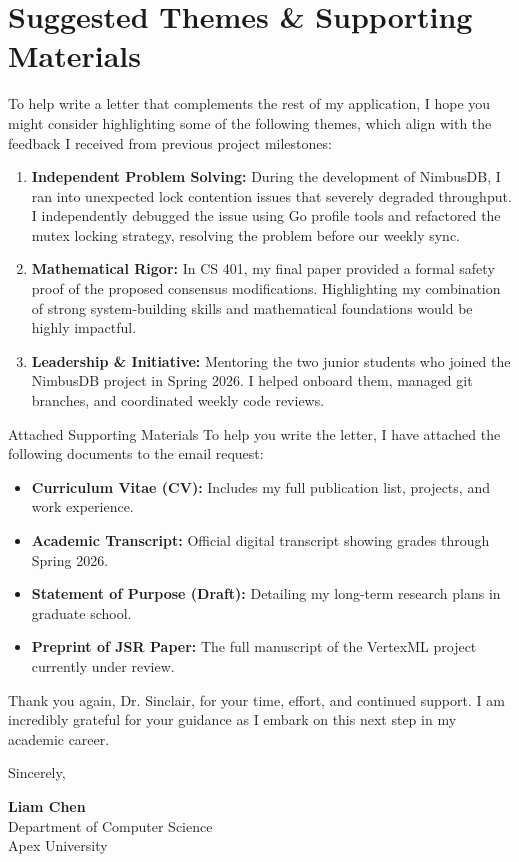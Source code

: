 \section{Suggested Themes \& Supporting Materials}

\noindent
To help write a letter that complements the rest of my application, I hope you might consider highlighting some of the following themes, which align with the feedback I received from previous project milestones:

\begin{enumerate}
    \item \textbf{Independent Problem Solving:} During the development of NimbusDB, I ran into unexpected lock contention issues that severely degraded throughput. I independently debugged the issue using Go profile tools and refactored the mutex locking strategy, resolving the problem before our weekly sync.
    \item \textbf{Mathematical Rigor:} In CS 401, my final paper provided a formal safety proof of the proposed consensus modifications. Highlighting my combination of strong system-building skills and mathematical foundations would be highly impactful.
    \item \textbf{Leadership \& Initiative:} Mentoring the two junior students who joined the NimbusDB project in Spring 2026. I helped onboard them, managed git branches, and coordinated weekly code reviews.
\end{enumerate}

\vspace{1.5em}

\begin{accentbox}{Attached Supporting Materials}
To help you write the letter, I have attached the following documents to the email request:
\begin{itemize}
    \item[\faFile] \textbf{Curriculum Vitae (CV):} Includes my full publication list, projects, and work experience.
    \item[\faGraduationCap] \textbf{Academic Transcript:} Official digital transcript showing grades through Spring 2026.
    \item[\faPen] \textbf{Statement of Purpose (Draft):} Detailing my long-term research plans in graduate school.
    \item[\faBook] \textbf{Preprint of JSR Paper:} The full manuscript of the VertexML project currently under review.
\end{itemize}
\end{accentbox}

\vspace{2em}

\noindent
Thank you again, Dr. Sinclair, for your time, effort, and continued support. I am incredibly grateful for your guidance as I embark on this next step in my academic career.

\medskip\noindent
Sincerely,

\vspace{1.5em}
\noindent
\textbf{Liam Chen} \\
Department of Computer Science \\
Apex University
